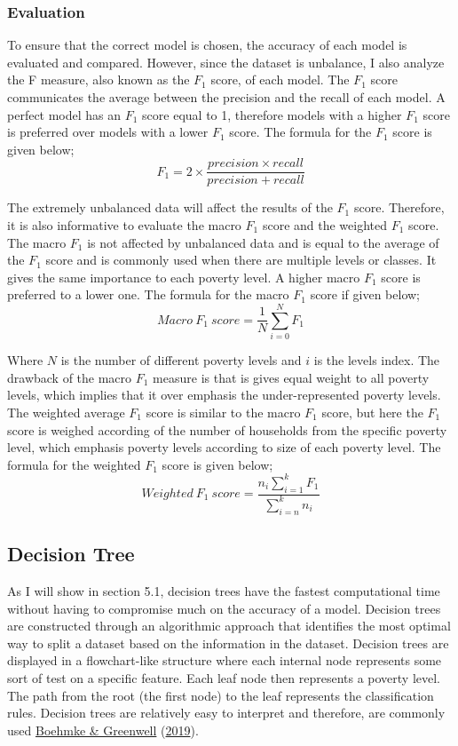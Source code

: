 \documentclass[11pt,preprint, authoryear]{elsarticle}
\numberwithin{equation}{section}
\numberwithin{figure}{section}
\numberwithin{table}{section}
\begin{document}
\hypertarget{evaluation}{%
\subsubsection{Evaluation}\label{evaluation}}

To ensure that the correct model is chosen, the accuracy of each model
is evaluated and compared. However, since the dataset is unbalance, I
also analyze the F measure, also known as the \(F_1\) score, of each
model. The \(F_1\) score communicates the average between the precision
and the recall of each model. A perfect model has an \(F_1\) score equal
to 1, therefore models with a higher \(F_1\) score is preferred over
models with a lower \(F_1\) score. The formula for the \(F_1\) score is
given below;
\[F_1 = 2\times \frac{ precision \times recall}{precision + recall}\]

The extremely unbalanced data will affect the results of the \(F_1\)
score. Therefore, it is also informative to evaluate the macro \(F_1\)
score and the weighted \(F_1\) score. The macro \(F_1\) is not affected
by unbalanced data and is equal to the average of the \(F_1\) score and
is commonly used when there are multiple levels or classes. It gives the
same importance to each poverty level. A higher macro \(F_1\) score is
preferred to a lower one. The formula for the macro \(F_1\) score if
given below; \[ Macro\: F_1\: score = \frac{1}{N}{\sum}_{i=0}^N F_1\]

Where \(N\) is the number of different poverty levels and \(i\) is the
levels index. The drawback of the macro \(F_1\) measure is that is gives
equal weight to all poverty levels, which implies that it over emphasis
the under-represented poverty levels. The weighted average \(F_1\) score
is similar to the macro \(F_1\) score, but here the \(F_1\) score is
weighed according of the number of households from the specific poverty
level, which emphasis poverty levels according to size of each poverty
level. The formula for the weighted \(F_1\) score is given below;
\[ Weighted\: F_1\: score = \frac{n_i\sum_{i=1}^k F_1}{\sum_{i=n}^k n_i}\]

\hypertarget{decision-tree}{%
\subsection{Decision Tree}\label{decision-tree}}

As I will show in section 5.1, decision trees have the fastest
computational time without having to compromise much on the accuracy of
a model. Decision trees are constructed through an algorithmic approach
that identifies the most optimal way to split a dataset based on the
information in the dataset. Decision trees are displayed in a
flowchart-like structure where each internal node represents some sort
of test on a specific feature. Each leaf node then represents a poverty
level. The path from the root (the first node) to the leaf represents
the classification rules. Decision trees are relatively easy to
interpret and therefore, are commonly used
\protect\hyperlink{ref-boehmke2019hands}{Boehmke \& Greenwell}
(\protect\hyperlink{ref-boehmke2019hands}{2019}).
\end{document}
